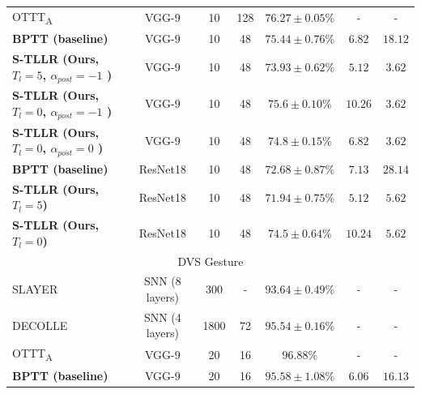 \documentclass[10pt]{article} %
\begin{document}
\begin{table}[t]
{\begin{tabular}{lcccccc}
        \multicolumn{1}{l}{OTTT\textsubscript{A}\citep{Xiao2022OnlineNetworks}} & \multicolumn{1}{c}{VGG-9} & \multicolumn{1}{c}{10} & 128 & $76.27\pm0.05\%$ & - & -\\ 
        \multicolumn{1}{l}{\textbf{BPTT (baseline)}} & \multicolumn{1}{c}{VGG-9} & \multicolumn{1}{c}{10} & 48 & $75.44\pm0.76\%$ & $6.82$ & $18.12$ \\ %
        \multicolumn{1}{l}{\textbf{S-TLLR (Ours, $T_l=5$, $\alpha_{post}=-1$ )}} & \multicolumn{1}{c}{VGG-9} & \multicolumn{1}{c}{10} & 48 & $73.93\pm0.62\%$ & $5.12$ & $3.62$ \\
        \multicolumn{1}{l}{\textbf{S-TLLR (Ours, $T_l=0$, $\alpha_{post}=-1$ )}} & \multicolumn{1}{c}{VGG-9} & \multicolumn{1}{c}{10} & 48 & $75.6\pm0.10\%$ & $10.26$ & $3.62$\\
        \multicolumn{1}{l}{\textbf{S-TLLR (Ours, $T_l=0$, $\alpha_{post}=0$ )}} & \multicolumn{1}{c}{VGG-9} & \multicolumn{1}{c}{10} & 48 & $74.8\pm0.15\%$ & $6.82$ & $3.62$ \\ 
        \multicolumn{1}{l}{\textbf{BPTT (baseline)}} & \multicolumn{1}{c}{ResNet18} & \multicolumn{1}{c}{10} & 48 & $72.68\pm0.87\%$ & $7.13$ & $28.14$ \\ %
        \multicolumn{1}{l}{\textbf{S-TLLR (Ours, $T_l=5$)}} & \multicolumn{1}{c}{ResNet18} & \multicolumn{1}{c}{10} & 48 & $71.94\pm0.75\%$ & $5.12$ & $5.62$ \\
        \multicolumn{1}{l}{\textbf{S-TLLR (Ours, $T_l=0$)}} & \multicolumn{1}{c}{ResNet18} & \multicolumn{1}{c}{10} & 48 & $74.5\pm0.64\%$ & $10.24$ & $5.62$\\
        \midrule
        \multicolumn{7}{c}{DVS Gesture } \\ \hline
        \multicolumn{1}{l}{SLAYER \citep{Shrestha2018SLAYER:Time}} & \multicolumn{1}{c}{SNN (8 layers)} & \multicolumn{1}{c}{300} & - & $93.64\pm0.49\%$ & - & -\\ %
        \multicolumn{1}{l}{DECOLLE\citep{Kaiser2020SynapticDECOLLE}} & \multicolumn{1}{c}{SNN (4 layers)} & \multicolumn{1}{c}{1800} & 72 & $95.54\pm0.16\%$ & - & -\\ %
        \multicolumn{1}{l}{OTTT\textsubscript{A}\citep{Xiao2022OnlineNetworks}} & \multicolumn{1}{c}{VGG-9} & \multicolumn{1}{c}{20} & 16 & $96.88\%$ & - & -\\ %
        \multicolumn{1}{l}{\textbf{BPTT (baseline)}} & \multicolumn{1}{c}{VGG-9} & \multicolumn{1}{c}{20} & 16 & $95.58\pm1.08\%$ & $6.06$ & $16.13$\\ %

\end{tabular}}
\end{table}
\end{document}

